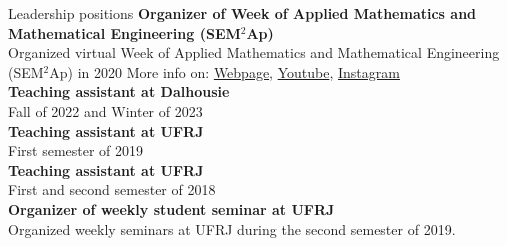 \documentclass{resume} %
\begin{document}
\begin{rSection}{Leadership positions}
{\bf Organizer of Week of Applied Mathematics and Mathematical Engineering (SEM$^2$Ap)}
\\
Organized virtual Week of Applied Mathematics and Mathematical Engineering (SEM$^2$Ap) in 2020
{\scriptsize More info on:  \href{http://semap.rio.br/2020/en/}{Webpage},   \href{https://www.youtube.com/channel/UC14NMQ5cOsSuLrAQGGa2T4Q}{Youtube}, 
\href{https://www.instagram.com/semap.rio/}{Instagram}}
\\
{\bf Teaching assistant at Dalhousie}
\\
Fall of 2022 and Winter of 2023
\\
{\bf Teaching assistant at UFRJ} 
\\
First semester of 2019
\\
{\bf Teaching assistant at UFRJ} 
\\
First and second semester of 2018
\\
{\bf Organizer of weekly student seminar at UFRJ}
\\
Organized weekly seminars at UFRJ during the second semester of 2019.
\end{rSection}


\end{document}
